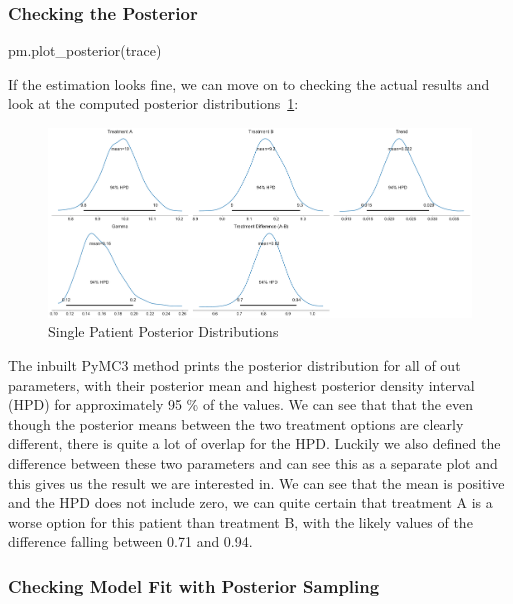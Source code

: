 \documentclass[12pt,a4paper,leqno]{report}
\theoremstyle{plain}
\theoremstyle{definition}
\theoremstyle{remark}
\begin{document}
\subsubsection{Checking the Posterior}

\bigskip
\begin{pyverbatim}
pm.plot_posterior(trace)
\end{pyverbatim}
\bigskip

If the estimation looks fine, we can move on to checking the actual results and look at
the computed posterior distributions\ \ref{singlepatientposteriors}:

\bigskip
\begin{figure}[H]
    \caption{Single Patient Posterior Distributions}
    \label{singlepatientposteriors}
    \bigskip
    \includegraphics[width=\textwidth,height=\textheight,keepaspectratio]{single_patient_posteriors.pdf}
\end{figure}
\bigskip

The inbuilt PyMC3 method prints the posterior distribution for all of out parameters,
with their posterior mean and highest posterior density interval (HPD) for approximately
95 \% of the values. We can see that that the even though the posterior means between
the two treatment options are clearly different, there is quite a lot of overlap for the
HPD. Luckily we also defined the difference between these two parameters and can see
this as a separate plot and this gives us the result we are interested in. We can see
that the mean is positive and the HPD does not include zero, we can quite certain that
treatment A is a worse option for this patient than treatment B, with the likely values of
the difference falling between 0.71 and 0.94.

\subsubsection{Checking Model Fit with Posterior Sampling}
\end{document}
